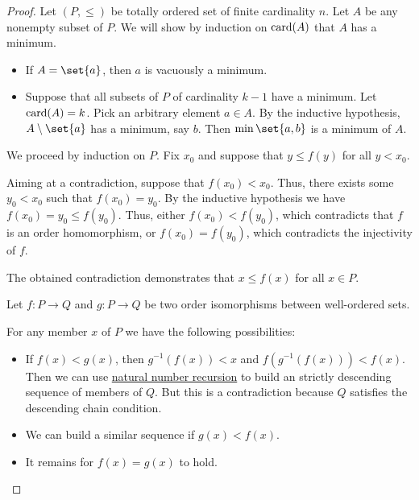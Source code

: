 \begin{proof}
   Let \( (P, \leq) \) be totally ordered set of finite cardinality \( n \). Let \( A \) be any nonempty subset of \( P \). We will show by induction on \( \operatorname{card}(A) \) that \( A \) has a minimum.

  \begin{itemize}
    \item If \( A = \set{ a } \), then \( a \) is vacuously a minimum.
    \item Suppose that all subsets of \( P \) of cardinality \( k - 1 \) have a minimum. Let \( \operatorname{card}(A) = k \). Pick an arbitrary element \( a \in A \). By the inductive hypothesis, \( A \setminus \set{ a } \) has a minimum, say \( b \). Then \( \min\set{ a, b } \) is a minimum of \( A \).
  \end{itemize}

   We proceed by induction on \( P \). Fix \( x_0 \) and suppose that \( y \leq f(y) \) for all \( y < x_0 \).

  Aiming at a contradiction, suppose that \( f(x_0) < x_0 \). Thus, there exists some \( y_0 < x_0 \) such that \( f(x_0) = y_0 \). By the inductive hypothesis we have \( f(x_0) = y_0 \leq f(y_0) \). Thus, either \( f(x_0) < f(y_0) \), which contradicts that \( f \) is an order homomorphism, or \( f(x_0) = f(y_0) \), which contradicts the injectivity of \( f \).

  The obtained contradiction demonstrates that \( x \leq f(x) \) for all \( x \in P \).

   Let \( f: P \to Q \) and \( g: P \to Q \) be two order isomorphisms between well-ordered sets.

  For any member \( x \) of \( P \) we have the following possibilities:
  \begin{itemize}
    \item If \( f(x) < g(x) \), then \( g^{-1}(f(x)) < x \) and \( f(g^{-1}(f(x))) < f(x) \). Then we can use \hyperref[rem:natural_number_recursion]{natural number recursion} to build an strictly descending sequence of members of \( Q \). But this is a contradiction because \( Q \) satisfies the descending chain condition.

    \item We can build a similar sequence if \( g(x) < f(x) \).

    \item It remains for \( f(x) = g(x) \) to hold.
  \end{itemize}


\end{proof}
